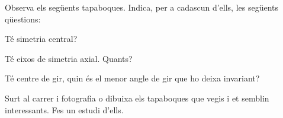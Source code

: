 \begin{mylist}
\begin{minipage}{0.5\textwidth}
	Observa els següents tapaboques. Indica, per a cadascun d'ells, les següents qüestions: 
	\vspace{0.25cm}
	
	\begin{tasks}
		\task Té simetria central?
		
		\task Té eixos de simetria axial. Quants?
		
		\task Té centre de gir, quin és el menor angle de gir que ho deixa invariant?
		
		\task Surt al carrer i fotografia o dibuixa els tapaboques que vegis i et semblin interessants. Fes un estudi d'ells.
		
	\end{tasks}

\end{minipage}

\end{mylist}


